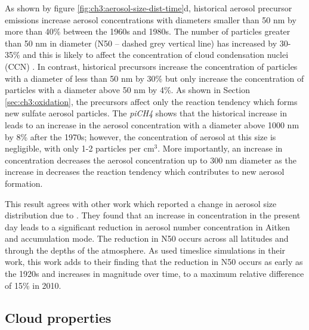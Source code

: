 As shown by figure \ref{fig:ch3:aerosol-size-dist-time}d, historical aerosol precursor emissions increase aerosol concentrations with diameters smaller than 50 nm by more than 40\%  between the 1960s and 1980s. The number of particles greater than 50 nm in diameter (N50 -- dashed grey vertical line) has increased by 30-35\% and this is likely to affect the concentration of cloud condensation nuclei (CCN) \citep{seinfeldAtmosphericChemistryPhysics2016}. In contrast, historical  precursors increase the concentration of particles with a diameter of less than 50 nm by 30\% but only increase the concentration of particles with a diameter above 50 nm by 4\%. As shown in Section \ref{sec:ch3:oxidation}, the  precursors affect only the  reaction tendency which forms new sulfate aerosol particles. The \textit{piCH4} shows that the historical increase in  leads to an increase in the aerosol concentration with a diameter above 1000 nm by 8\% after the 1970s; however, the concentration of aerosol at this size is negligible, with only 1-2 particles per cm${^3}$. More importantly, an increase in  concentration decreases the aerosol concentration up to 300 nm diameter as the increase in  decreases the  reaction tendency which contributes to new aerosol formation. 

This result agrees with other work which reported a change in aerosol size distribution due to  \citep{oconnorApportionmentPreIndustrial2022}. They found that an increase in  concentration in the present day leads to a significant reduction in aerosol number concentration in Aitken and accumulation mode. The reduction in N50 occurs across all latitudes and through the depths of the atmosphere. As \citet{oconnorApportionmentPreIndustrial2022} used timeslice simulations in their work, this work adds to their finding that the reduction in N50 occurs as early as the 1920s and increases in magnitude over time, to a maximum relative difference of 15\% in 2010. 

\subsection{Cloud properties}


